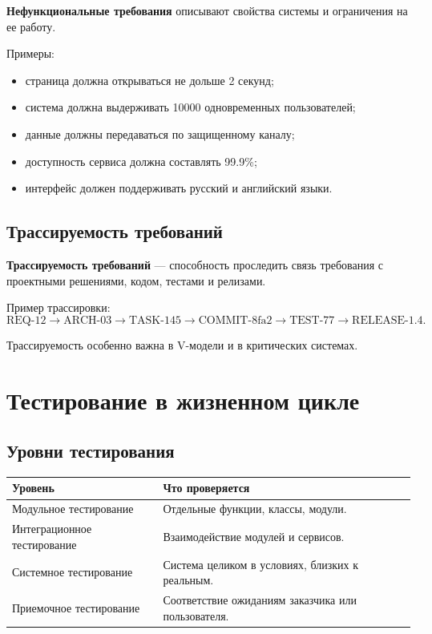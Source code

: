 \documentclass[12pt,a4paper]{article}
\begin{document}
\textbf{Нефункциональные требования} описывают свойства системы и ограничения на ее работу.

Примеры:
\begin{itemize}
    \item страница должна открываться не дольше 2 секунд;
    \item система должна выдерживать 10000 одновременных пользователей;
    \item данные должны передаваться по защищенному каналу;
    \item доступность сервиса должна составлять 99.9\%;
    \item интерфейс должен поддерживать русский и английский языки.
\end{itemize}

\subsection{Трассируемость требований}

\textbf{Трассируемость требований} --- способность проследить связь требования с проектными решениями, кодом, тестами и релизами.

Пример трассировки:
\[
\text{REQ-12}
\rightarrow
\text{ARCH-03}
\rightarrow
\text{TASK-145}
\rightarrow
\text{COMMIT-8fa2}
\rightarrow
\text{TEST-77}
\rightarrow
\text{RELEASE-1.4}.
\]

Трассируемость особенно важна в V-модели и в критических системах.

\section{Тестирование в жизненном цикле}

\subsection{Уровни тестирования}

\begin{center}
\begin{tabular}{p{} p{}}
\toprule
\textbf{Уровень} & \textbf{Что проверяется} \\
\midrule
Модульное тестирование & Отдельные функции, классы, модули. \\
Интеграционное тестирование & Взаимодействие модулей и сервисов. \\
Системное тестирование & Система целиком в условиях, близких к реальным. \\
Приемочное тестирование & Соответствие ожиданиям заказчика или пользователя. \\
\bottomrule
\end{tabular}
\end{center}
\end{document}
